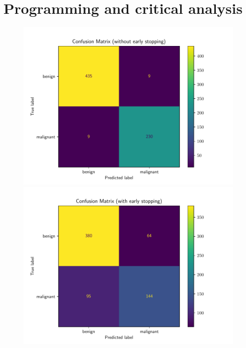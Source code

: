 \documentclass{exam}
\begin{document}
    \section{Programming and critical analysis}
    \begin{questions}
        \setcounter{question}{1}
        \item \quad
        \begin{figure}[H]
            \centering
            \begin{minipage}[b]{0.49\textwidth}
              \includegraphics[width=\textwidth]{mlp_conf_matrix_False.pdf}
            \end{minipage}
            \begin{minipage}[b]{0.49\textwidth}
              \includegraphics[width=\textwidth]{mlp_conf_matrix_True.pdf}

\end{minipage}
\end{figure}
\end{questions}
\end{document}
